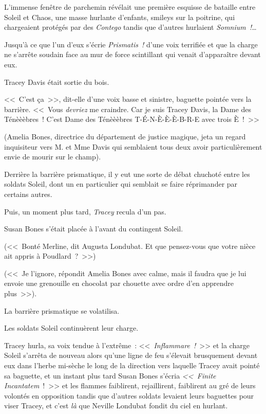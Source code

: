 \later

L'immense fenêtre de parchemin révélait une première esquisse de bataille entre Soleil et Chaos, une masse hurlante d'enfants, smileys sur la poitrine, qui chargeaient protégés par des \emph{Contego} tandis que d'autres hurlaient \emph{Somnium~!}…

Jusqu'à ce que l'un d'eux s'écrie \emph{Prismatis~!} d'une voix terrifiée et que la charge ne s'arrête soudain face au mur de force scintillant qui venait d'apparaître devant eux.

Tracey Davis était sortie du bois.

<<~C'est ça~>>, dit-elle d'une voix basse et sinistre, baguette pointée vers la barrière. <<~Vous \emph{devriez} me craindre. Car je suis Tracey Davis, la Dame des Ténèèèbres~! C'est Dame des Ténèèèbres T-É-N-È-È-È-B-R-E avec trois È~!~>>

(Amelia Bones, directrice du département de justice magique, jeta un regard inquisiteur vers M. et Mme Davis qui semblaient tous deux avoir particulièrement envie de mourir sur le champ).

Derrière la barrière prismatique, il y eut une sorte de débat chuchoté entre les soldats Soleil, dont un en particulier qui semblait se faire réprimander par certains autres.

Puis, un moment plus tard, \emph{Tracey} recula d'un pas.

Susan Bones s'était placée à l'avant du contingent Soleil.

(<<~Bonté Merline, dit Augusta Londubat. Et que pensez-vous que votre nièce ait appris à Poudlard~?~>>)

(<<~Je l'ignore, répondit Amelia Bones avec calme, mais il faudra que je lui envoie une grenouille en chocolat par chouette avec ordre d'en apprendre plus~>>).

La barrière prismatique se volatilisa.

Les soldats Soleil continuèrent leur charge.

Tracey hurla, sa voix tendue à l'extrême~: <<~\emph{Inflammare~!}~>> et la charge Soleil s'arrêta de nouveau alors qu'une ligne de feu s'élevait brusquement devant eux dans l'herbe mi-sèche le long de la direction vers laquelle Tracey avait pointé sa baguette, et un instant plus tard Susan Bones s'écria \emph{<<~Finite Incantatem}~!~>> et les flammes faiblirent, rejaillirent, faiblirent au gré de leurs volontés en opposition tandis que d'autres soldats levaient leurs baguettes pour viser Tracey, et c'est \emph{là} que Neville Londubat fondit du ciel en hurlant.

